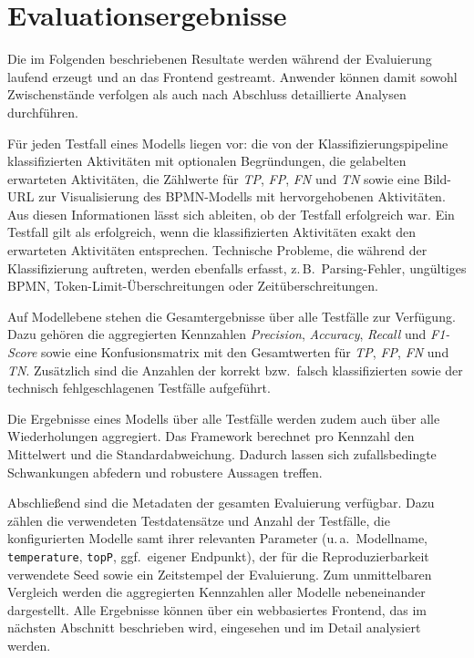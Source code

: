 \section{Evaluationsergebnisse}\label{sec:generierte-resultate}

Die im Folgenden beschriebenen Resultate werden während der Evaluierung laufend erzeugt und an das Frontend gestreamt. Anwender können damit sowohl Zwischenstände verfolgen als auch nach Abschluss detaillierte Analysen durchführen.

Für jeden Testfall eines Modells liegen vor: die von der Klassifizierungspipeline klassifizierten Aktivitäten mit optionalen Begründungen, die gelabelten erwarteten Aktivitäten, die Zählwerte für \emph{\ac{TP}}, \emph{\ac{FP}}, \emph{\ac{FN}} und \emph{\ac{TN}} sowie eine Bild-URL zur Visualisierung des \ac{BPMN}-Modells mit hervorgehobenen Aktivitäten. Aus diesen Informationen lässt sich ableiten, ob der Testfall erfolgreich war. Ein Testfall gilt als erfolgreich, wenn die klassifizierten Aktivitäten exakt den erwarteten Aktivitäten entsprechen. Technische Probleme, die während der Klassifizierung auftreten, werden ebenfalls erfasst, z.\,B.\ Parsing-Fehler, ungültiges \ac{BPMN}, Token-Limit-Überschreitungen oder Zeitüberschreitungen.

Auf Modellebene stehen die Gesamtergebnisse über alle Testfälle zur Verfügung. Dazu gehören die aggregierten Kennzahlen \emph{Precision}, \emph{Accuracy}, \emph{Recall} und \emph{F1-Score} sowie eine Konfusionsmatrix mit den Gesamtwerten für \emph{\ac{TP}}, \emph{\ac{FP}}, \emph{\ac{FN}} und \emph{\ac{TN}}. Zusätzlich sind die Anzahlen der korrekt bzw.\ falsch klassifizierten sowie der technisch fehlgeschlagenen Testfälle aufgeführt.

Die Ergebnisse eines Modells über alle Testfälle werden zudem auch über alle Wiederholungen aggregiert. Das Framework berechnet pro Kennzahl den Mittelwert und die Standardabweichung. Dadurch lassen sich zufallsbedingte Schwankungen abfedern und robustere Aussagen treffen.

Abschließend sind die Metadaten der gesamten Evaluierung verfügbar. Dazu zählen die verwendeten Testdatensätze und Anzahl der Testfälle, die konfigurierten Modelle samt ihrer relevanten Parameter (u.\,a.\ Modellname, \texttt{temperature}, \texttt{topP}, ggf.\ eigener Endpunkt), der für die Reproduzierbarkeit verwendete Seed sowie ein Zeitstempel der Evaluierung. Zum unmittelbaren Vergleich werden die aggregierten Kennzahlen aller Modelle nebeneinander dargestellt. Alle Ergebnisse können über ein webbasiertes Frontend, das im nächsten Abschnitt beschrieben wird, eingesehen und im Detail analysiert werden.
